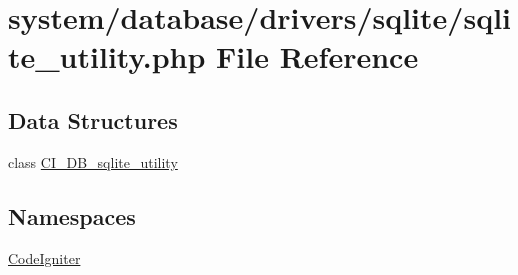 \hypertarget{sqlite__utility_8php}{}\section{system/database/drivers/sqlite/sqlite\+\_\+utility.php File Reference}
\label{sqlite__utility_8php}
\subsection*{Data Structures}
\begin{DoxyCompactItemize}
\item 
class \mbox{\hyperlink{class_c_i___d_b__sqlite__utility}{C\+I\+\_\+\+D\+B\+\_\+sqlite\+\_\+utility}}
\end{DoxyCompactItemize}
\subsection*{Namespaces}
\begin{DoxyCompactItemize}
\item 
 \mbox{\hyperlink{namespace_code_igniter}{Code\+Igniter}}
\end{DoxyCompactItemize}
